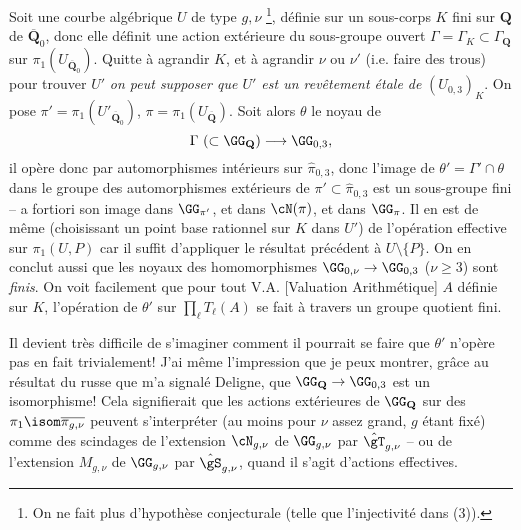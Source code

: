 Soit une courbe algébrique $U$ de type $g,\nu$
\footnote{On ne fait plus d'hypothèse conjecturale (telle que
l'injectivité dans (3)).},
définie sur un sous-corps $K$ fini sur $\mathbf{Q}$ de $\overline{\mathbf{Q}}_0$,
donc elle définit une action extérieure du sous-groupe ouvert $\Gamma=
\Gamma_K\subset \Gamma_\mathbf{Q}$ sur $\pi_1(U_{\overline{\mathbf{Q}}_0})$.  Quitte
à agrandir $K$, et à agrandir $\nu$ ou $\nu'$ (i.e. faire des trous)
pour trouver $U'$ {\it on peut supposer que $U'$ est un revêtement étale
de} $(U_{0,3})_K$.  On pose $\pi'=\pi_1(U'_{\overline{\mathbf{Q}}_0})$,
$\pi=\pi_1(U_{\overline{\mathbf{Q}}})$.  Soit alors $\theta$ le noyau de
$$\Gamma\ (\subset  \GG_\mathbf{Q})\longrightarrow \GG_{0,3},$$
il opère donc par automorphismes intérieurs sur $\hat\pi_{0,3}$,
donc l'image de $\theta'=\Gamma'\cap\theta$ dans le groupe des
automorphismes extérieurs de $\pi'\subset \hat\pi_{0,3}$ est
un sous-groupe fini -- a fortiori son image dans $\GG_{\pi'}$, et
dans $\cN(\pi)$, et dans $\GG_\pi$.  Il en est de même (choisissant
un point base rationnel sur $K$ dans $U'$) de l'opération
effective sur $\pi_1(U,P)$ car il suffit d'appliquer le
résultat précédent à $U\setminus\{P\}$.  On en conclut
aussi que les noyaux des homomorphismes $\GG_{0,\nu}\to
\GG_{0,3}$ ($\nu\ge 3$) sont {\it finis}.  On voit facilement
que pour tout V.A. [Valuation Arithmétique]
$A$ définie sur $K$, l'opération de $\theta'$
sur $\prod_{\ell}T_\ell(A)$ se fait à travers un groupe quotient fini.

Il devient très difficile de s'imaginer comment il pourrait se faire
que $\theta'$ n'opère pas en fait trivialement!  J'ai même l'impression que 
je peux montrer, gr\^ace au résultat du russe que m'a signalé Deligne,
que $\GG_\mathbf{Q}\to\GG_{0,3}$ est un isomorphisme! Cela signifierait
que les actions extérieures de $\GG_\mathbf{Q}$ sur des $\pi_1 \isom 
\overline{\pi_{g,\nu}}$ peuvent s'interpréter (au moins pour $\nu$
assez grand, $g$ étant fixé) comme des scindages de l'extension
$\cN_{g,\nu}$ de $\GG_{g,\nu}$ par $\hat\gT_{g,\nu}$ -- ou de
l'extension $M_{g,\nu}$ de $\GG_{g,\nu}$ par $\hat\gS_{g,\nu}$,
quand il s'agit d'actions effectives.

